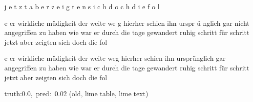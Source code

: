 \documentclass[a4paper,10pt,twoside]{article}
\begin{document}
{\color[rgb]{0.0,0,0} j}{\color[rgb]{0.048,0,0} e}{\color[rgb]{0.041,0,0} t}{\color[rgb]{0.039,0,0} z}{\color[rgb]{0.0,0,0} t} {\color[rgb]{0.0,0,0} a}{\color[rgb]{0.089,0,0} b}{\color[rgb]{0.083,0,0} e}{\color[rgb]{0.057,0,0} r} {\color[rgb]{0.521,0,0} z}{\color[rgb]{0.387,0,0} e}{\color[rgb]{0.0,0,0} i}{\color[rgb]{0.196,0,0} g}{\color[rgb]{0.138,0,0} t}{\color[rgb]{0.268,0,0} e}{\color[rgb]{0.269,0,0} n} {\color[rgb]{0.0,0,0} s}{\color[rgb]{0.024,0,0} i}{\color[rgb]{0.078,0,0} c}{\color[rgb]{0.94,0,0} h} {\color[rgb]{0.965,0,0} d}{\color[rgb]{0.551,0,0} o}{\color[rgb]{1,0,0} c}{\color[rgb]{0.359,0,0} h} {\color[rgb]{1,0,0} d}{\color[rgb]{1,0,0} i}{\color[rgb]{0.794,0,0} e} {\color[rgb]{0.203,0,0} f}{\color[rgb]{0.0,0,0} o}{\color[rgb]{0.0,0,0} l}

e er wirkliche müdigkeit der weite we{\color[rgb]{1,0,0} g} hierher schien ihn urspr{\color[rgb]{1,0,0} ü}{\color[rgb]{1,0,0} n}glich gar {\color[rgb]{1,0,0} n}icht angegriffen zu haben wie war er durch die tage gewandert ruhig schritt für schritt jetzt aber zeigten sich doch die fol

 {\color[rgb]{1,0,0} e} {\color[rgb]{0,0,1} er} wirkliche müdigkeit der weite weg {\color[rgb]{1,0,0} hierher} schien ihn ursprünglich {\color[rgb]{1,0,0} gar}  angegriffen zu haben wie war {\color[rgb]{0,0,1} er} durch die tage gewandert ruhig schritt für schritt jetzt aber zeigten sich doch die fol

 {\footnotesize {\color[rgb]{0.6, 0.6, 0.6}truth:0.0,~pred:~0.02}} (old, lime table, lime text)\hrulefill
\end{document}
